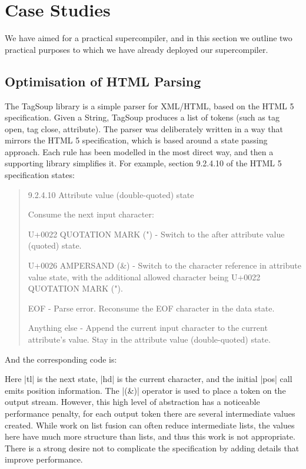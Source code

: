 \documentclass[draft]{sigplanconf}
\begin{document}
\section{Case Studies}

We have aimed for a practical supercompiler, and in this section we outline two practical purposes to which we have already deployed our supercompiler.

\subsection{Optimisation of HTML Parsing}
\label{sec:tagsoup}

The TagSoup library \cite{tagsoup} is a simple parser for XML/HTML, based on the HTML 5 specification. Given a String, TagSoup produces a list of tokens (such as tag open, tag close, attribute). The parser was deliberately written in a way that mirrors the HTML 5 specification, which is based around a state passing approach. Each rule has been modelled in the most direct way, and then a supporting library simplifies it. For example, section 9.2.4.10 of the HTML 5 specification states:

\begin{quote}
9.2.4.10 Attribute value (double-quoted) state

Consume the next input character:

U+0022 QUOTATION MARK (") - Switch to the after attribute value (quoted) state.

U+0026 AMPERSAND (\&) - Switch to the character reference in attribute value state, with the additional allowed character being U+0022 QUOTATION MARK (").

EOF - Parse error. Reconsume the EOF character in the data state.

Anything else - Append the current input character to the current attribute's value. Stay in the attribute value (double-quoted) state.
\end{quote}

And the corresponding code is:


Here |tl| is the next state, |hd| is the current character, and the initial |pos| call emits position information. The |(&)| operator is used to place a token on the output stream. However, this high level of abstraction has a noticeable performance penalty, for each output token there are several intermediate values created. While work on list fusion can often reduce intermediate lists, the values here have much more structure than lists, and thus this work is not appropriate. There is a strong desire not to complicate the specification by adding details that improve performance.
\end{document}
